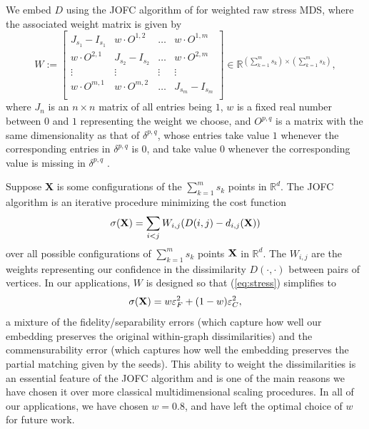 \documentclass[12pt]{article}
\numberwithin{equation}{section}
\theoremstyle{definition}
\begin{document}
We embed $D$ using the JOFC algorithm of \cite{smacof} for weighted raw stress MDS, where the associated weight matrix is given by
$$W:=\begin{bmatrix}
      J_{s_1}-I_{s_1} & w\cdot O^{1,2} &\ldots   &w\cdot O^{1,m}\\
      w \cdot O^{2,1} & J_{s_2}-I_{s_2} &\ldots   &w \cdot O^{2,m}\\
      \vdots  & \vdots          &\vdots   &\vdots  \\
      w\cdot O^{m,1} &w \cdot O^{m,2}          &\ldots   &J_{s_m}-I_{s_m}\\
      \end{bmatrix} \in \mathbb{R}^{(\sum\limits_{k=1}^{m}s_k) \times (\sum\limits_{k=1}^{m}s_k) },$$
where $J_n$ is an $n \times n$ matrix of all entries being $1$, $w$ is a fixed real number between $0$ and $1$ representing the weight we choose,  and $O^{p,q}$ is a matrix with the same dimensionality as that of $\delta^{p,q}$, whose entries take value $1$ whenever the corresponding entries in $\delta^{p,q}$ is $0$, and take value $0$ whenever the corresponding value is missing in $\delta^{p,q}$ \cite{fastjofc}.


Suppose {\bf X} is some configurations of the $\sum\limits_{k=1}^{m}s_k$
points in $\mathbb{R}^d$. The JOFC algorithm is an iterative procedure
minimizing the cost function
\begin{align}
\label{eq:stress}
\sigma({\bf X}) = \sum\limits_{i<j} W_{i,j}(D(i,j) - d_{i,j}({\bf X}))
\end{align}
over all possible configurations of $\sum\limits_{k=1}^{m} s_k$ points ${\bf X}$ in $\mathbb{R}^d$.  The $W_{i,j}$ are the weights representing our confidence in the dissimilarity
$D(\cdot,\cdot)$ between pairs of vertices.  In our applications, $W$ is designed so that (\ref{eq:stress}) simplifies to
\begin{equation}
\label{eq:stress2}
\sigma({\bf X})=w \varepsilon^2_{F}+(1-w)\varepsilon^2_{C},
\end{equation}
a mixture of the fidelity/separability errors (which capture how well our embedding preserves the original within-graph dissimilarities) and the commensurability error (which captures how well the embedding preserves the partial matching given by the seeds).  This ability to weight the dissimilarities is an essential feature of the JOFC algorithm and is one of the main reasons we have chosen it over more classical multidimensional scaling procedures.  In all of our applications, we have chosen $w=0.8$, and have left the optimal choice of $w$ for future work.
\end{document}

